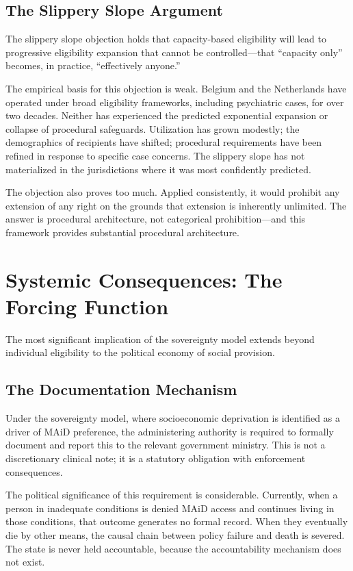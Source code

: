 \documentclass[11pt, letterpaper]{article}
\begin{document}
\subsection{The Slippery Slope Argument}

The slippery slope objection holds that capacity-based eligibility will lead to
progressive eligibility expansion that cannot be controlled---that ``capacity only''
becomes, in practice, ``effectively anyone.''

The empirical basis for this objection is weak. Belgium and the Netherlands have
operated under broad eligibility frameworks, including psychiatric cases, for over
two decades. Neither has experienced the predicted exponential expansion or collapse
of procedural safeguards. Utilization has grown modestly; the demographics of
recipients have shifted; procedural requirements have been refined in response to
specific case concerns. The slippery slope has not materialized in the jurisdictions
where it was most confidently predicted.

The objection also proves too much. Applied consistently, it would prohibit any
extension of any right on the grounds that extension is inherently unlimited. The
answer is procedural architecture, not categorical prohibition---and this framework
provides substantial procedural architecture.

\section{Systemic Consequences: The Forcing Function}

The most significant implication of the sovereignty model extends beyond individual
eligibility to the political economy of social provision.

\subsection{The Documentation Mechanism}

Under the sovereignty model, where socioeconomic deprivation is identified as a
driver of MAiD preference, the administering authority is required to formally
document and report this to the relevant government ministry. This is not a
discretionary clinical note; it is a statutory obligation with enforcement
consequences.

The political significance of this requirement is considerable. Currently, when a
person in inadequate conditions is denied MAiD access and continues living in
those conditions, that outcome generates no formal record. When they eventually
die by other means, the causal chain between policy failure and death is severed.
The state is never held accountable, because the accountability mechanism does
not exist.
\end{document}
